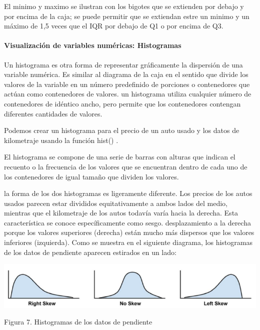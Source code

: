 \documentclass[
  letterpaper,
  DIV=11,
  numbers=noendperiod]{scrartcl}
\let\oldparagraph\paragraph
\renewcommand{\paragraph}[1]{\oldparagraph{#1}\mbox{}}
\begin{document}
El minimo y maximo se ilustran con los bigotes que se extienden por
debajo y por encima de la caja; se puede permitir que se extiendan estre
un minimo y un máximo de 1,5 veces que el IQR por debajo de Q1 o por
encima de Q3.

\hypertarget{visualizaciuxf3n-de-variables-numuxe9ricas-histogramas}{%
\paragraph{\texorpdfstring{\textbf{Visualización de variables numéricas:
Histogramas}}{Visualización de variables numéricas: Histogramas}}\label{visualizaciuxf3n-de-variables-numuxe9ricas-histogramas}}

Un histograma es otra forma de representar gráficamente la dispersión de
una variable numérica. Es similar al diagrama de la caja en el sentido
que divide los valores de la variable en un número predefinido de
porciones o contenedores que actúan como contenedores de valores. un
histograma utiliza cualquier número de contenedores de idéntico ancho,
pero permite que los contenedores contengan diferentes cantidades de
valores.

Podemos crear un histograma para el precio de un auto usado y los datos
de kilometraje usando la función hist() .

El histograma se compone de una serie de barras con alturas que indican
el recuento o la frecuencia de los valores que se encuentran dentro de
cada uno de los contenedores de igual tamaño que dividen los valores.

la forma de los dos histogramas es ligeramente diferente. Los precios de
los autos usados \hspace{0pt}\hspace{0pt}parecen estar divididos
equitativamente a ambos lados del medio, mientras que el kilometraje de
los autos todavía varía hacia la derecha. Esta característica se conoce
específicamente como sesgo. desplazamiento a la derecha porque los
valores superiores (derecha) están mucho más dispersos que los valores
inferiores (izquierda). Como se muestra en el siguiente diagrama, los
histogramas de los datos de pendiente aparecen estirados en un lado:

\begin{Figura 7. Histogramas de los datos de pendiente}

{\centering \includegraphics{cap7.png}

}

\caption{Figura 7. Histogramas de los datos de pendiente}

\end{Figura 7. Histogramas de los datos de pendiente}
\end{document}

